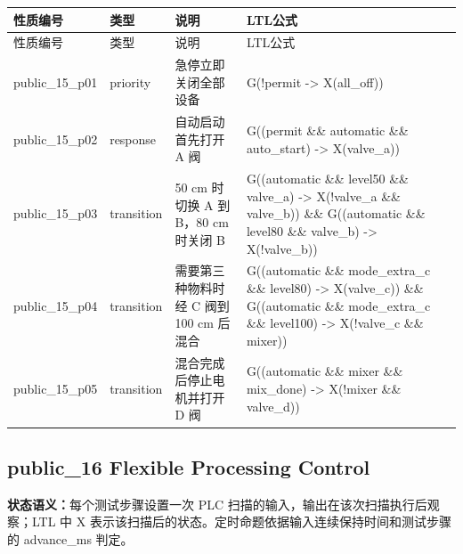 \begin{longtable}{L{2.3cm}L{1.7cm}L{4.1cm}L{5.2cm}}

\toprule

性质编号 & 类型 & 说明 & LTL公式\\

\midrule

\endfirsthead

\toprule

性质编号 & 类型 & 说明 & LTL公式\\

\midrule

\endhead

{\ttfamily public\_15\_p01} & priority & 急停立即关闭全部设备 & {\ttfamily G(!permit -> X(all\_off))}\\

{\ttfamily public\_15\_p02} & response & 自动启动首先打开 A 阀 & {\ttfamily G((permit \&\& automatic \&\& auto\_start) -> X(valve\_a))}\\

{\ttfamily public\_15\_p03} & transition & 50 cm 时切换 A 到 B，80 cm 时关闭 B & {\ttfamily G((automatic \&\& level50 \&\& valve\_a) -> X(!valve\_a \&\& valve\_b)) \&\& G((automatic \&\& level80 \&\& valve\_b) -> X(!valve\_b))}\\

{\ttfamily public\_15\_p04} & transition & 需要第三种物料时经 C 阀到 100 cm 后混合 & {\ttfamily G((automatic \&\& mode\_extra\_c \&\& level80) -> X(valve\_c)) \&\& G((automatic \&\& mode\_extra\_c \&\& level100) -> X(!valve\_c \&\& mixer))}\\

{\ttfamily public\_15\_p05} & transition & 混合完成后停止电机并打开 D 阀 & {\ttfamily G((automatic \&\& mixer \&\& mix\_done) -> X(!mixer \&\& valve\_d))}\\

\bottomrule

\end{longtable}

\subsection{{\ttfamily public\_16} Flexible Processing Control}

\noindent\textbf{状态语义：}每个测试步骤设置一次 PLC 扫描的输入，输出在该次扫描执行后观察；LTL 中 X 表示该扫描后的状态。定时命题依据输入连续保持时间和测试步骤的 advance\_ms 判定。

